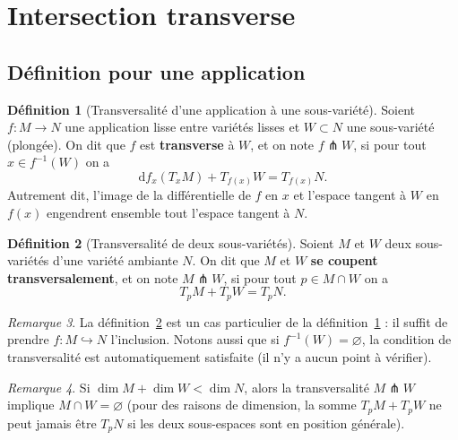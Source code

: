 \documentclass[12pt,a4paper,openany]{book}
\theoremstyle{definition}
\newtheorem{definition}{Définition}[chapter]
\theoremstyle{plain}
\theoremstyle{remark}
\newtheorem{remarque}[definition]{Remarque}
\newcommand{\dd}{\mathrm{d}}
\begin{document}
\section{Intersection transverse}\label{sec:intersection-transverse}

\subsection{Définition pour une application}\label{subsec:transverse-application}

\begin{definition}[Transversalité d'une application à une sous-variété]%
\label{def:transverse-application}
Soient $f \colon M \to N$ une application lisse entre variétés lisses et
$W \subset N$ une sous-variété (plongée). On dit que $f$ est
\textbf{transverse} à $W$, et on note $f \pitchfork W$, si pour tout
$x \in f^{-1}(W)$ on a
\[
  \dd f_x(T_x M) + T_{f(x)} W = T_{f(x)} N.
\]
Autrement dit, l'image de la différentielle de $f$ en $x$ et l'espace
tangent à $W$ en $f(x)$ engendrent ensemble tout l'espace tangent à $N$.
\end{definition}

\begin{definition}[Transversalité de deux sous-variétés]%
\label{def:transverse-sous-varietes}
Soient $M$ et $W$ deux sous-variétés d'une variété ambiante $N$. On dit
que $M$ et $W$ \textbf{se coupent transversalement}, et on note
$M \pitchfork W$, si pour tout $p \in M \cap W$ on a
\[
  T_p M + T_p W = T_p N.
\]
\end{definition}

\begin{remarque}\label{rem:transverse-inclusion}
La définition~\ref{def:transverse-sous-varietes} est un cas particulier de
la définition~\ref{def:transverse-application} : il suffit de prendre
$f \colon M \hookrightarrow N$ l'inclusion. Notons aussi que si
$f^{-1}(W) = \varnothing$, la condition de transversalité est
automatiquement satisfaite (il n'y a aucun point à vérifier).
\end{remarque}

\begin{remarque}\label{rem:transverse-codimension}
Si $\dim M + \dim W < \dim N$, alors la transversalité $M \pitchfork W$
implique $M \cap W = \varnothing$ (pour des raisons de dimension, la somme
$T_p M + T_p W$ ne peut jamais être $T_p N$ si les deux sous-espaces sont
en position générale).
\end{remarque}
\end{document}
